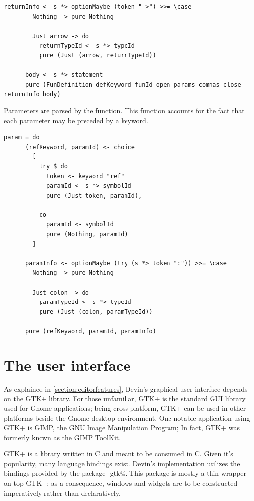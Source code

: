 \documentclass[UdineBachThesis,american,11pt]{PhdThesis}
\begin{document}
  \newpage

  \begin{lstlisting}[gobble=4,basicstyle=\ttfamily\small]
      returnInfo <- s *> optionMaybe (token "->") >>= \case
        Nothing -> pure Nothing

        Just arrow -> do
          returnTypeId <- s *> typeId
          pure (Just (arrow, returnTypeId))

      body <- s *> statement
      pure (FunDefinition defKeyword funId open params commas close returnInfo body)
  \end{lstlisting}

  Parameters are parsed by the \lstinline@param@ function. This function
  accounts for the fact that each parameter may be preceded by a \lstinline@ref@
  keyword.

  \begin{lstlisting}[gobble=4,basicstyle=\ttfamily\small]
    param = do
      (refKeyword, paramId) <- choice
        [
          try $ do
            token <- keyword "ref"
            paramId <- s *> symbolId
            pure (Just token, paramId),

          do
            paramId <- symbolId
            pure (Nothing, paramId)
        ]

      paramInfo <- optionMaybe (try (s *> token ":")) >>= \case
        Nothing -> pure Nothing

        Just colon -> do
          paramTypeId <- s *> typeId
          pure (Just (colon, paramTypeId))

      pure (refKeyword, paramId, paramInfo)
  \end{lstlisting}

  \section{The user interface}

  As explained in \autoref{section:editorfeatures}, Devin's graphical user
  interface depends on the GTK+ library. For those unfamiliar, GTK+ is the
  standard GUI library used for Gnome applications; being cross-platform, GTK+
  can be used in other platforms beside the Gnome desktop environment. One
  notable application using GTK+ is GIMP, the GNU Image Manipulation Program; In
  fact, GTK+ was formerly known as the GIMP ToolKit.

  GTK+ is a library written in C and meant to be consumed in C. Given it's
  popularity, many language bindings exist. Devin's implementation utilizes the
  bindings provided by the package \lstinline@gi-gtk@. This package is mostly a
  thin wrapper on top GTK+; as a consequence, windows and widgets are to be
  constructed imperatively rather than declaratively.
\end{document}
